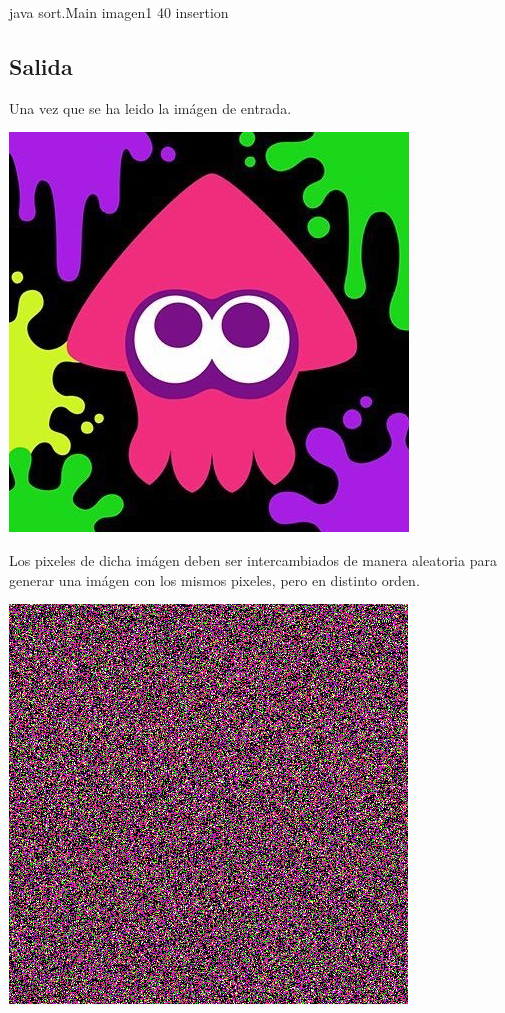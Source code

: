 \documentclass{article}
\begin{document}
\begin{center}
java sort.Main imagen1 40 insertion
\end{center}

\subsection{Salida}

Una vez que se ha leido la imágen de entrada.

\begin{center}
\includegraphics[scale=0.25]{ink}
\end{center}

Los pixeles de dicha imágen deben ser intercambiados de manera aleatoria
para generar una imágen con los mismos pixeles, pero en distinto orden.

\begin{center}
\includegraphics[scale=0.25]{ink2}
\end{center}
\end{document}
